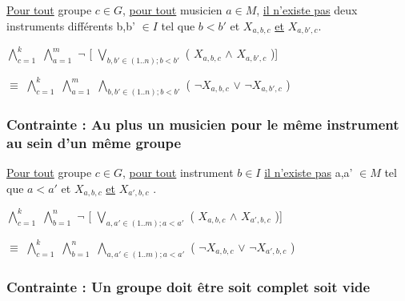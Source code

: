\documentclass[a4paper,10pt]{article}
\begin{document}
\underline{Pour tout} groupe $c \in G$, \underline{pour tout} musicien $a \in M $, \underline{il n'existe pas} deux instruments différents b,b' $\in I$  tel que $b < b'$ et $X_{a,b,c}$
\underline{et} $X_{a,b',c}$.


$\bigwedge \limits_{c=1}^{k}$ $\bigwedge \limits_{a=1}^{m}$ $\neg$ [ $\bigvee \limits_{b,b' \in (1..n); b < b'}$ ( $X_{a,b,c}$ $\wedge$ $X_{a,b',c}$ )]


$\equiv$ $\bigwedge \limits_{c=1}^{k}$ $\bigwedge \limits_{a=1}^{m}$  $\bigwedge \limits_{b,b' \in (1..n); b < b'}$ ( $\neg X_{a,b,c}$ $\vee $ $ \neg X_{a,b',c}$ )


\subsubsection{Contrainte : Au plus un musicien pour le même instrument au sein d'un même groupe}
 
\underline{Pour tout} groupe $c \in G$, \underline{pour tout} instrument $b \in I$ \underline{il n'existe pas} a,a' $\in M$  tel que $a < a'$ et $X_{a,b,c}$
\underline{et} $X_{a',b,c}$ . 
 
$\bigwedge \limits_{c=1}^{k}$ $\bigwedge \limits_{b=1}^{n}$ $\neg$ [ $\bigvee \limits_{a,a' \in (1..m); a < a'}$ ( $X_{a,b,c}$ $\wedge$ $X_{a',b,c}$ )]


$\equiv$ $\bigwedge \limits_{c=1}^{k}$ $\bigwedge \limits_{b=1}^{n}$  $\bigwedge \limits_{a,a' \in (1..m); a < a'}$ ( $\neg X_{a,b,c}$ $\vee $ $ \neg X_{a',b,c}$ ) 
 
 
\subsubsection{Contrainte : Un groupe doit être soit complet soit vide} 
 
\end{document}
